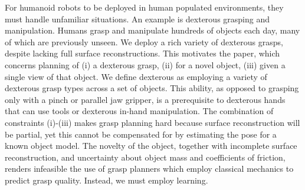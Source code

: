 \noindent
For humanoid robots to be deployed in human populated environments, they must handle unfamiliar situations. An example is dexterous grasping and manipulation. Humans grasp and manipulate hundreds of objects each day, many of which are previously unseen. We deploy a rich variety of dexterous grasps, despite lacking full surface reconstructions. This motivates the paper, which concerns planning of (i) a dexterous grasp, (ii) for a novel object, (iii) given a single view of that object. We define dexterous as employing a variety of dexterous grasp types across a set of objects. This ability, as opposed to grasping only with a pinch or parallel jaw gripper, is a prerequisite to dexterous hands that can use tools or dexterous in-hand manipulation. The combination of constraints (i)-(iii) makes grasp planning hard because surface reconstruction will be partial, yet this cannot be compensated for by estimating the pose for a known object model. The novelty of the object, together with incomplete surface reconstruction, and uncertainty about object mass and coefficients of friction, renders infeasible the use of grasp planners which employ classical mechanics to predict grasp quality. Instead, we must employ learning.

